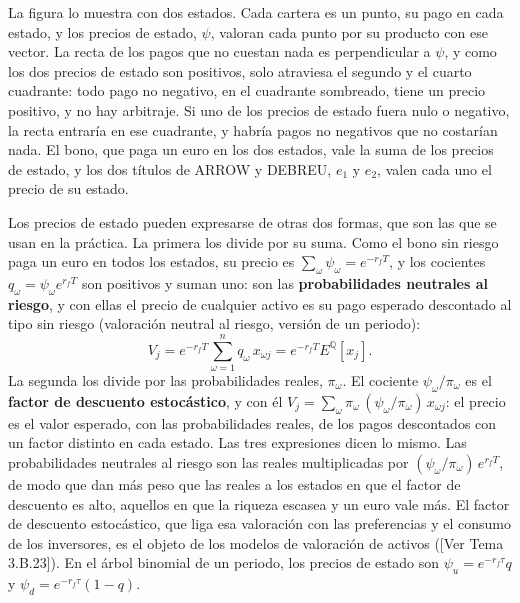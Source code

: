 \documentclass[10pt,a4paper]{article}
\newcommand{\authorfont}[1]{{\fontfamily{EBGaramond-TLF}\selectfont #1}}
\begin{document}
La figura lo muestra con dos estados. Cada cartera es un punto, su pago en cada estado, y los precios de estado, $\psi$, valoran cada punto por su producto con ese vector. La recta de los pagos que no cuestan nada es perpendicular a $\psi$, y como los dos precios de estado son positivos, solo atraviesa el segundo y el cuarto cuadrante: todo pago no negativo, en el cuadrante sombreado, tiene un precio positivo, y no hay arbitraje. Si uno de los precios de estado fuera nulo o negativo, la recta entraría en ese cuadrante, y habría pagos no negativos que no costarían nada. El bono, que paga un euro en los dos estados, vale la suma de los precios de estado, y los dos títulos de ARROW y DEBREU, $e_1$ y $e_2$, valen cada uno el precio de su estado.

Los precios de estado pueden expresarse de otras dos formas, que son las que se usan en la práctica. La primera los divide por su suma. Como el bono sin riesgo paga un euro en todos los estados, su precio es $\sum_\omega\psi_\omega=e^{-r_fT}$, y los cocientes $q_\omega=\psi_\omega e^{r_fT}$ son positivos y suman uno: son las \textbf{probabilidades neutrales al riesgo}, y con ellas el precio de cualquier activo es su pago esperado descontado al tipo sin riesgo (valoración neutral al riesgo, versión de un periodo):
$$V_j=e^{-r_fT}\sum_{\omega=1}^{n}q_\omega\,x_{\omega j}=e^{-r_fT}E^{\mathbb{Q}}\left[x_j\right].$$
La segunda los divide por las probabilidades reales, $\pi_\omega$. El cociente $\psi_\omega/\pi_\omega$ es el \textbf{factor de descuento estocástico}, y con él $V_j=\sum_\omega\pi_\omega\,(\psi_\omega/\pi_\omega)\,x_{\omega j}$: el precio es el valor esperado, con las probabilidades reales, de los pagos descontados con un factor distinto en cada estado. Las tres expresiones dicen lo mismo. Las probabilidades neutrales al riesgo son las reales multiplicadas por $(\psi_\omega/\pi_\omega)\,e^{r_fT}$, de modo que dan más peso que las reales a los estados en que el factor de descuento es alto, aquellos en que la riqueza escasea y un euro vale más. El factor de descuento estocástico, que liga esa valoración con las preferencias y el consumo de los inversores, es el objeto de los modelos de valoración de activos ([\authorfont{Ver Tema 3.B.23}]). En el árbol binomial de un periodo, los precios de estado son $\psi_u=e^{-r_f\tau}q$ y $\psi_d=e^{-r_f\tau}(1-q)$.
\end{document}
